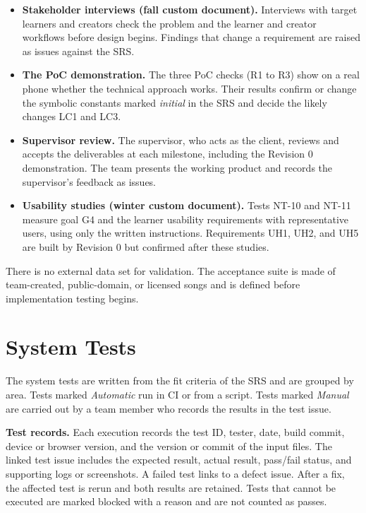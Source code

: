 \documentclass[12pt, titlepage]{article}
\begin{document}
\begin{itemize}
  \item \textbf{Stakeholder interviews (fall custom document).} Interviews with
        target learners and creators check the problem and the learner and
        creator workflows before design begins. Findings that change a
        requirement are raised as issues against the SRS.
  \item \textbf{The PoC demonstration.} The three PoC checks (R1 to R3) show on
        a real phone whether the technical approach works. Their results
        confirm or change the symbolic constants marked \emph{initial} in the
        SRS and decide the likely changes LC1 and LC3.
  \item \textbf{Supervisor review.} The supervisor, who acts as the client,
        reviews and accepts the deliverables at each milestone, including the
        Revision 0 demonstration. The team presents the working product and
        records the supervisor's feedback as issues.
  \item \textbf{Usability studies (winter custom document).} Tests NT-10 and
        NT-11 measure goal G4 and the learner usability requirements with
        representative users, using only the written instructions.
        Requirements UH1, UH2, and UH5 are built by Revision 0 but confirmed
        after these studies.
\end{itemize}

There is no external data set for validation. The acceptance suite is made of
team-created, public-domain, or licensed songs and is defined before
implementation testing begins.

\section{System Tests} \label{SecSystemTests}

The system tests are written from the fit criteria of the SRS and are grouped
by area. Tests marked \emph{Automatic} run in CI or from a script. Tests marked
\emph{Manual} are carried out by a team member who records the results in the
test issue.

\textbf{Test records.} Each execution records the test ID, tester, date,
build commit, device or browser version, and the version or commit of
the input files. The linked test issue includes the expected result,
actual result, pass/fail status, and supporting logs or screenshots.
A failed test links to a defect issue. After a fix, the affected test
is rerun and both results are retained. Tests that cannot be executed
are marked blocked with a reason and are not counted as passes.
\end{document}
